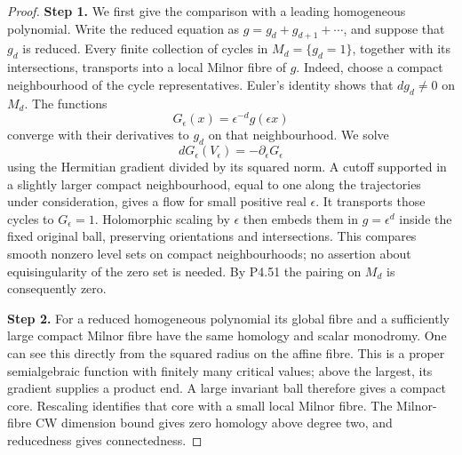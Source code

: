 \begin{proof}
\noindent\textbf{Step 1.} We first give the comparison with a leading
homogeneous polynomial. Write the reduced equation
as $g=g_d+g_{d+1}+\cdots$, and suppose that $g_d$ is
reduced. Every finite collection of cycles in
$M_d=\{g_d=1\}$, together with its intersections,
transports into a local Milnor fibre of $g$.
Indeed, choose a compact neighbourhood of the cycle
representatives. Euler's identity shows that
$dg_d\ne0$ on $M_d$. The functions
\[
 G_\epsilon(x)=\epsilon^{-d}g(\epsilon x)
\]
converge with their derivatives to $g_d$ on that
neighbourhood. We solve
\[
 dG_\epsilon(V_\epsilon)
                     =-\partial_\epsilon G_\epsilon
\]
using the Hermitian gradient divided by its squared
norm. A cutoff supported in a slightly larger
compact neighbourhood, equal to one along the
trajectories under consideration, gives a flow for
small positive real $\epsilon$. It transports those
cycles to $G_\epsilon=1$. Holomorphic scaling by
$\epsilon$ then embeds them in $g=\epsilon^d$ inside
the fixed original ball, preserving orientations
and intersections. This compares smooth nonzero
level sets on compact neighbourhoods; no assertion
about equisingularity of the zero set is needed.
By P4.51 the pairing on $M_d$ is consequently zero.

\noindent\textbf{Step 2.} For a reduced homogeneous polynomial its global
fibre and a sufficiently large compact Milnor fibre
have the same homology and scalar monodromy. One
can see this directly from the squared radius on
the affine fibre. This is a proper semialgebraic
function with finitely many critical values; above
the largest, its gradient supplies a product end.
A large invariant ball therefore gives a compact
core. Rescaling identifies that core with a small
local Milnor fibre. The Milnor-fibre CW dimension
bound gives zero homology above degree two, and
reducedness gives connectedness.


\end{proof}
